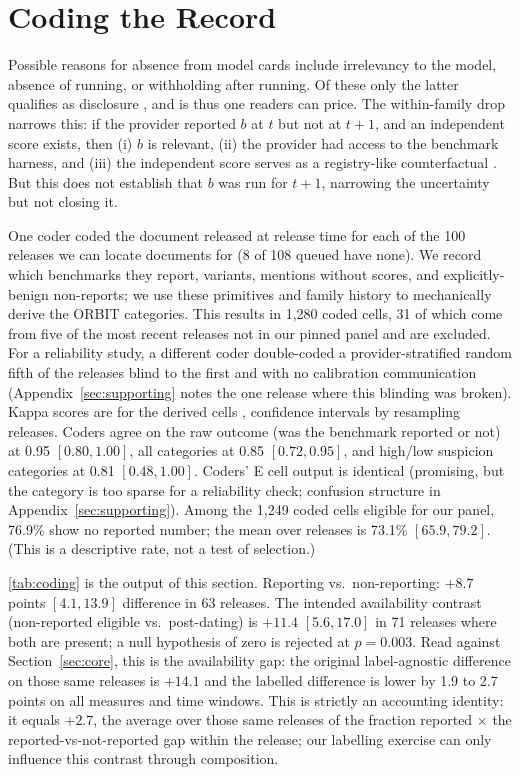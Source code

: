 \section{Coding the Record}\label{sec:reach}

Possible reasons for absence from model cards include irrelevancy to the model, absence of running, or withholding after running. Of these only the latter qualifies as disclosure \citep{grossman1981,milgrom1981,dye1985}, and is thus one readers can price. The within-family drop narrows this: if the provider reported $b$ at $t$ but not at $t + 1$, and an independent score exists, then (i) $b$ is relevant, (ii) the provider had access to the benchmark harness, and (iii) the independent score serves as a registry-like counterfactual \citep{chan2004,dwan2013,kirkham2010}. But this does not establish that $b$ was run for $t + 1$, narrowing the \citet{dye1985} uncertainty but not closing it.

One coder coded the document released at release time for each of the 100 releases we can locate documents for (8 of 108 queued have none). We record which benchmarks they report, variants, mentions without scores, and explicitly-benign non-reports; we use these primitives and family history to mechanically derive the ORBIT categories. This results in 1,280 coded cells, 31 of which come from five of the most recent releases not in our pinned panel and are excluded. For a reliability study, a different coder double-coded a provider-stratified random fifth of the releases blind to the first and with no calibration communication (Appendix~\ref{sec:supporting} notes the one release where this blinding was broken). Kappa scores are for the derived cells \citep{cohen1960}, confidence intervals by resampling releases. Coders agree on the raw outcome (was the benchmark reported or not) at 0.95 $[0.80, 1.00]$, all categories at 0.85 $[0.72, 0.95]$, and high/low suspicion categories at 0.81 $[0.48, 1.00]$. Coders' E cell output is identical (promising, but the category is too sparse for a reliability check; confusion structure in Appendix~\ref{sec:supporting}). Among the 1,249 coded cells eligible for our panel, 76.9\% show no reported number; the mean over releases is 73.1\% $[65.9, 79.2]$. (This is a descriptive rate, not a test of selection.)



\autoref{tab:coding} is the output of this section. Reporting vs.\ non-reporting: $+8.7$ points $[4.1, 13.9]$ difference in 63 releases. The intended availability contrast (non-reported eligible vs.\ post-dating) is $+11.4$ $[5.6, 17.0]$ in 71 releases where both are present; a null hypothesis of zero is rejected at $p = 0.003$. Read against Section~\ref{sec:core}, this is the availability gap: the original label-agnostic difference on those same releases is $+14.1$ and the labelled difference is lower by 1.9 to 2.7 points on all measures and time windows. This is strictly an accounting identity: it equals $+2.7$, the average over those same releases of the fraction reported $\times$ the reported-vs-not-reported gap within the release; our labelling exercise can only influence this contrast through composition.

